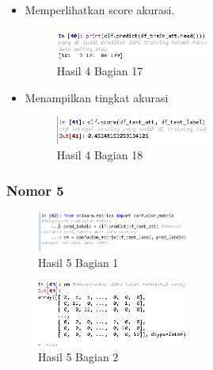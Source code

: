 \begin{itemize}
\item Memperlihatkan score akurasi.

\begin{figure}[H]
\centerline{\includegraphics[width=5cm]{figures/1174079/3/praktek19.PNG}}
\caption{Hasil 4 Bagian 17}
\label{labelgambar}
\end{figure}

\item Menampilkan tingkat akurasi

\begin{figure}[H]
\centerline{\includegraphics[width=5cm]{figures/1174079/3/praktek20.PNG}}
\caption{Hasil 4 Bagian 18}
\label{labelgambar}
\end{figure}
\end{itemize}

\subsubsection{Nomor 5}
\hfill\break

\begin{figure}[H]
\centerline{\includegraphics[width=5cm]{figures/1174079/3/praktek21.PNG}}
\caption{Hasil 5 Bagian 1}
\label{labelgambar}
\end{figure}


\begin{figure}[H]
\centerline{\includegraphics[width=5cm]{figures/1174079/3/praktek22.PNG}}
\caption{Hasil 5 Bagian 2}
\label{labelgambar}
\end{figure}

